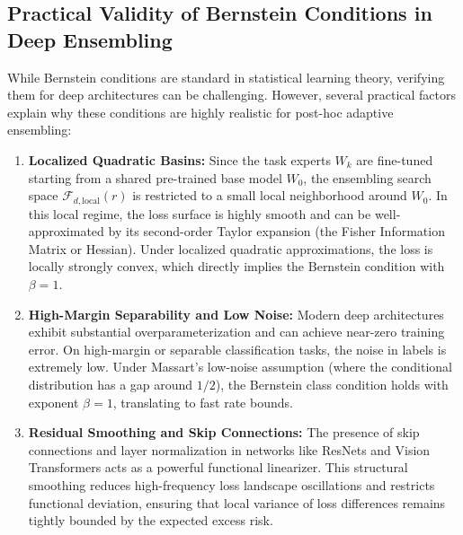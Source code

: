 \documentclass{article}
\theoremstyle{plain}
\theoremstyle{definition}
\theoremstyle{remark}
\begin{document}
\subsection{Practical Validity of Bernstein Conditions in Deep Ensembling}
While Bernstein conditions are standard in statistical learning theory, verifying them for deep architectures can be challenging. However, several practical factors explain why these conditions are highly realistic for post-hoc adaptive ensembling:
\begin{enumerate}
    \item \textbf{Localized Quadratic Basins:} Since the task experts $W_k$ are fine-tuned starting from a shared pre-trained base model $W_0$, the ensembling search space $\mathcal{F}_{d, \text{local}}(r)$ is restricted to a small local neighborhood around $W_0$. In this local regime, the loss surface is highly smooth and can be well-approximated by its second-order Taylor expansion (the Fisher Information Matrix or Hessian). Under localized quadratic approximations, the loss is locally strongly convex, which directly implies the Bernstein condition with $\beta = 1$.
    \item \textbf{High-Margin Separability and Low Noise:} Modern deep architectures exhibit substantial overparameterization and can achieve near-zero training error. On high-margin or separable classification tasks, the noise in labels is extremely low. Under Massart's low-noise assumption (where the conditional distribution has a gap around $1/2$), the Bernstein class condition holds with exponent $\beta = 1$, translating to fast rate bounds.
    \item \textbf{Residual Smoothing and Skip Connections:} The presence of skip connections and layer normalization in networks like ResNets and Vision Transformers acts as a powerful functional linearizer. This structural smoothing reduces high-frequency loss landscape oscillations and restricts functional deviation, ensuring that local variance of loss differences remains tightly bounded by the expected excess risk.
\end{enumerate}
\end{document}
